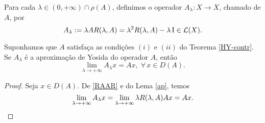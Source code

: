 \begin{definition}
Para cada $\lambda \in (0,+\infty) \cap \rho(A)$, definimos o operador $A_\lambda: X\longrightarrow X$, chamado  de $A$, por 
\begin{equation*}
A_\lambda :=\lambda AR(\lambda,A) =\lambda^2R(\lambda,A) -\lambda \operatorname{I}\in \mathcal{L}(X).
\end{equation*}
\end{definition}

\begin{lemma}\label{Plem3.3}
 Suponhamos que $A$ satisfaça as condições $(i)$ e $(ii)$ do Teorema \ref{HY-contr}. 
Se $A_\lambda$ é a aproximação de Yosida do operador $A$, então
\begin{equation*}
\lim_{\lambda \to +\infty}A_\lambda x=Ax,\; \forall\, x\in D(A).
\end{equation*}
\end{lemma}
\begin{proof}
Seja $x\in D(A)$. De \eqref{RAAR} e do Lema \ref{ap}, temos
\begin{equation*}
\lim_{\lambda \to +\infty}A_\lambda x=\lim_{\lambda \to +\infty}\lambda R(\lambda,A) Ax=Ax.
\end{equation*}
\end{proof}


